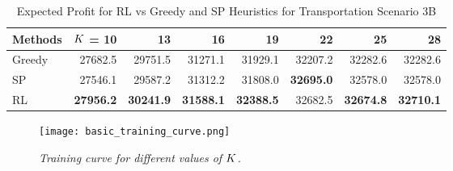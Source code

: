 \documentclass{article} %
\begin{document}
\begin{table}[h!]
\begin{center}
\caption{Expected Profit for RL vs Greedy and SP Heuristics for Transportation Scenario 3B\label{table4}}
\begin{tabular}{lrrrrrrr}
\toprule[1.2pt]
\textbf{Methods} 
& $K$ \textbf{= 10} & \textbf{13} & \textbf{16} & \textbf{19} & \textbf{22} & \textbf{25} & \textbf{28} \\ \hline
Greedy & 27682.5 & 29751.5 & 31271.1 & 31929.1 & 32207.2 & 32282.6 & 32282.6 \\
SP & 27546.1 & 29587.2 & 31312.2 & 31808.0 & \textbf{32695.0} & 32578.0 & 32578.0 \\
RL & \textbf{27956.2} & \textbf{30241.9} & \textbf{31588.1} & \textbf{32388.5} & 32682.5 & \textbf{32674.8} & \textbf{32710.1} \\ \hline
\bottomrule[1.2pt]
\end{tabular}
\end{center}
\end{table}


\begin{figure}[htp]
\centering  
\texttt{[image: basic\_training\_curve.png]}
\caption{\textit{Training curve for different values of $K$.}  \label{trainingcurve}}
\vspace{-6mm}
\end{figure}
\end{document}
